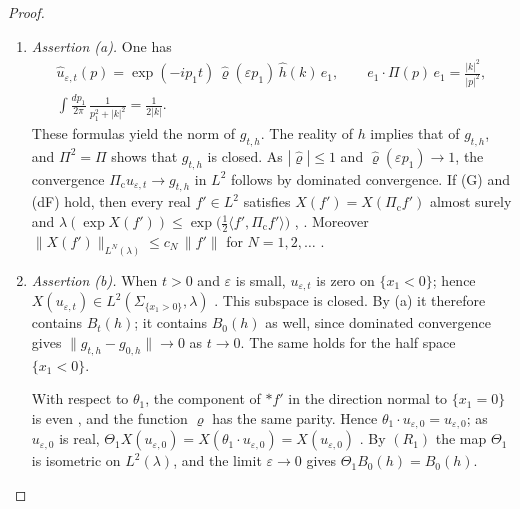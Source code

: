 \documentclass[11pt,letterpaper,reqno]{amsart}
\theoremstyle{definition}
\begin{document}
\begin{proof}
\begin{enumerate}
\item[1.] \emph{Assertion (a).}
One has
\begin{gather*}
\hat u_{\varepsilon,t}(p)=\exp(-ip_1t)\,\hat\varrho(\varepsilon p_1)\,\hat h(k)\,e_1,\qquad
e_1\cdot\Pi(p)\,e_1=\frac{|k|^2}{|p|^2},\\
\int\frac{dp_1}{2\pi}\,\frac{1}{p_1^2+|k|^2}=\frac{1}{2|k|}.
\end{gather*}
These formulas yield the norm of $g_{t,h}$.
The reality of $h$ implies that of $g_{t,h}$, and $\Pi^2=\Pi$ shows that $g_{t,h}$ is closed.
As $|\hat\varrho|\le1$ and $\hat\varrho(\varepsilon p_1)\to1$, the convergence $\Pi_{\mathrm c}u_{\varepsilon,t}\to g_{t,h}$ in $L^2$ follows by dominated convergence.
If (G) and (dF) hold, then every real $f'\in L^2$ satisfies $X(f')=X(\Pi_{\mathrm c}f')$ almost surely and $\lambda(\exp X(f'))\le\exp\bigl(\frac12\langle f',\allowbreak \Pi_{\mathrm c}f'\rangle\bigr)$ \cite[Proposition~45.1\,(4), (11)]{QEDIII}, \cite[Remark~14.4]{QEDII}.
Moreover $\|X(f')\|_{L^N(\lambda)}\le c_N\,\|f'\|$ for $N=1,2,\dots$ \cite[Lemma~14.3\,(a)]{QEDII}.
\item[2.] \emph{Assertion (b).}
When $t>0$ and $\varepsilon$ is small, $u_{\varepsilon,t}$ is zero on $\{x_1<0\}$; hence $X(u_{\varepsilon,t})\in L^2(\Sigma_{\{x_1>0\}},\lambda)$ \cite[Lemma~14.3\,(a)]{QEDII}.
This subspace is closed.
By (a) it therefore contains $B_t(h)$; it contains $B_0(h)$ as well, since dominated convergence gives $\|g_{t,h}-g_{0,h}\|\to0$ as $t\to0$.
The same holds for the half space $\{x_1<0\}$.

With respect to $\theta_1$, the component of $\ast f'$ in the direction normal to $\{x_1=0\}$ is even \cite[Section~14.1, after Definition~14.1]{QEDII}, and the function $\varrho$ has the same parity.
Hence $\theta_1\cdot u_{\varepsilon,0}=u_{\varepsilon,0}$; as $u_{\varepsilon,0}$ is real, $\Theta_1X(u_{\varepsilon,0})=\allowbreak X(\theta_1\cdot u_{\varepsilon,0})=\allowbreak X(u_{\varepsilon,0})$ \cite[Section~14.1, after Definition~14.1]{QEDII}.
By $(R_1)$ the map $\Theta_1$ is isometric on $L^2(\lambda)$, and the limit $\varepsilon\to0$ gives $\Theta_1B_0(h)=B_0(h)$.


\end{enumerate}
\end{proof}
\end{document}
